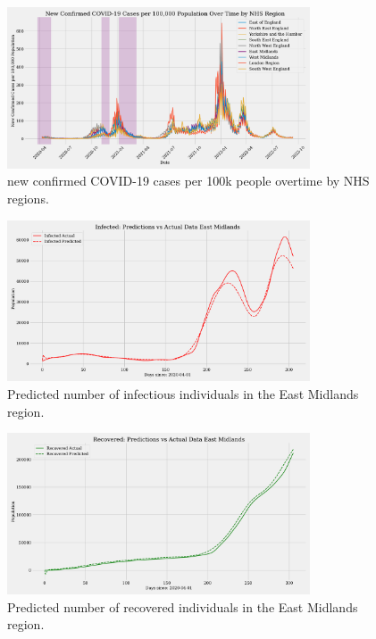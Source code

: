 \documentclass[12pt, letterpaper]{report}
\begin{document}
\begin{figure}[ht]
    \centering
    \includegraphics[width=0.8\textwidth]{"images/new_confirmed_per_100k.pdf"}
    \caption{new confirmed COVID-19 cases per 100k people overtime by NHS regions.}
    \label{fig:new_confirmed_per_100k}
\end{figure}

\begin{figure}[ht]
    \centering
    \includegraphics[width=0.8\textwidth]{images/pinn/I_predictions_East Midlands.pdf}
    \caption{Predicted number of infectious individuals in the East Midlands region.}
    \label{fig:I_predictions_East_Midlands}
\end{figure}

\begin{figure}[ht]
    \centering
    \includegraphics[width=0.8\textwidth]{images/pinn/R_predictions_East Midlands.pdf}
    \caption{Predicted number of recovered individuals in the East Midlands region.}
    \label{fig:R_predictions_East_Midlands}
\end{figure}
\end{document}
